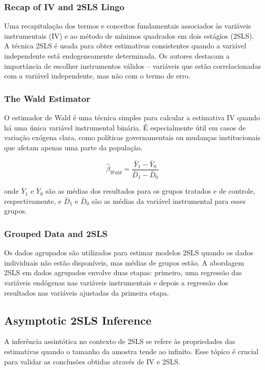 \documentclass[a4paper,12pt]{article}[abntex2]
\begin{document}
\subsubsection{Recap of IV and 2SLS Lingo}
Uma recapitulação dos termos e conceitos fundamentais associados às variáveis instrumentais (IV) e ao método de mínimos quadrados em dois estágios (2SLS). A técnica 2SLS é usada para obter estimativas consistentes quando a variável independente está endogeneamente determinada. Os autores destacam a importância de escolher instrumentos válidos – variáveis que estão correlacionadas com a variável independente, mas não com o termo de erro.

\subsubsection{The Wald Estimator}
O estimador de Wald é uma técnica simples para calcular a estimativa IV quando há uma única variável instrumental binária. É especialmente útil em casos de variação exógena clara, como políticas governamentais ou mudanças institucionais que afetam apenas uma parte da população.

\begin{equation}
\hat{\beta}_{Wald} = \frac{\bar{Y}_1 - \bar{Y}_0}{\bar{D}_1 - \bar{D}_0}
\end{equation}

onde \( \bar{Y}_1 \) e \( \bar{Y}_0 \) são as médias dos resultados para os grupos tratados e de controle, respectivamente, e \( \bar{D}_1 \) e \( \bar{D}_0 \) são as médias da variável instrumental para esses grupos.

\subsubsection{Grouped Data and 2SLS}
Os dados agrupados são utilizados para estimar modelos 2SLS quando os dados individuais não estão disponíveis, mas médias de grupos estão. A abordagem 2SLS em dados agrupados envolve duas etapas: primeiro, uma regressão das variáveis endógenas nas variáveis instrumentais e depois a regressão dos resultados nas variáveis ajustadas da primeira etapa.

\subsection{Asymptotic 2SLS Inference}
A inferência assintótica no contexto de 2SLS se refere às propriedades das estimativas quando o tamanho da amostra tende ao infinito. Esse tópico é crucial para validar as conclusões obtidas através de IV e 2SLS.
\end{document}
